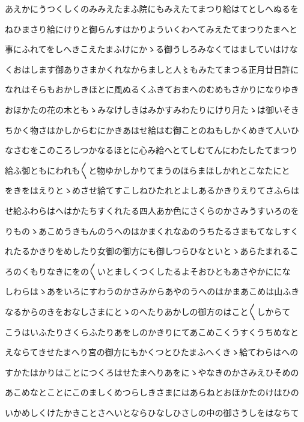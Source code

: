 \documentclass[a4paper,11pt,landscape]{ltjtarticle}
\begin{document}
\par\medskip
あえかにうつくしくのみみえたまふ院にもみえたてまつり給はてとしへぬるを
\par\medskip
ねひまさり給にけりと御らんすはかりよういくわへてみえたてまつりたまへと
\par\medskip
事にふれてをしへきこえたまふけにかゝる御うしろみなくてはましていはけな
\par\medskip
くおはします御ありさまかくれなからましと人〻もみたてまつる正月廿日許に
\par\medskip
なれはそらもおかしきほとに風ぬるくふきておまへのむめもさかりになりゆき
\par\medskip
おほかたの花の木ともゝみなけしきはみかすみわたりにけり月たゝは御いそき
\par\medskip
ちかく物さはかしからむにかきあはせ給はむ御ことのねもしかくめきて人いひ
\par\medskip
なさむをこのころしつかなるほとに心み給へとてしむてんにわたしたてまつり
\par\medskip
給ふ御ともにわれも〱と物ゆかしかりてまうのほらまほしかれとこなたにと
\par\medskip
をきをはえりとゝめさせ給てすこしねひたれとよしあるかきりえりてさふらは
\par\medskip
せ給ふわらはへはかたちすくれたる四人あか色にさくらのかさみうすいろのを
\par\medskip
りものゝあこめうきもんのうへのはかまくれなゐのうちたるさまもてなしすく
\par\medskip
れたるかきりをめしたり女御の御方にも御しつらひなといとゝあらたまれるこ
\par\medskip
ろのくもりなきにをの〱いとましくつくしたるよそおひともあさやかににな
\par\medskip
しわらはゝあをいろにすわうのかさみからあやのうへのはかまあこめは山ふき
\par\medskip
なるからのきをおなしさまにとゝのへたりあかしの御方のはこと〱しからて
\par\medskip
こうはいふたりさくらふたりあをしのかきりにてあこめこくうすくうちめなと
\par\medskip
えならてきせたまへり宮の御方にもかくつとひたまふへくきゝ給てわらはへの
\par\medskip
すかたはかりはことにつくろはせたまへりあをにゝやなきのかさみえひそめの
\par\medskip
あこめなとことにこのましくめつらしきさまにはあらねとおほかたのけはひの
\par\medskip
いかめしくけたかきことさへいとならひなしひさしの中の御さうしをはなちて
\par\medskip
\end{document}
